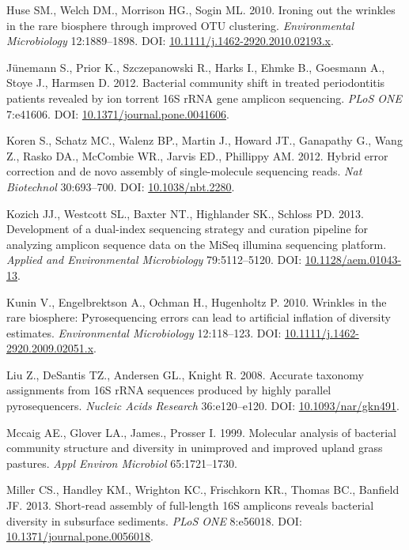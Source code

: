 \documentclass[11pt,]{article}
\begin{document}
\hypertarget{ref-Huse2010}{}
Huse SM., Welch DM., Morrison HG., Sogin ML. 2010. Ironing out the
wrinkles in the rare biosphere through improved OTU clustering.
\emph{Environmental Microbiology} 12:1889--1898. DOI:
\href{https://doi.org/10.1111/j.1462-2920.2010.02193.x}{10.1111/j.1462-2920.2010.02193.x}.

\hypertarget{ref-Junemann2012}{}
Jünemann S., Prior K., Szczepanowski R., Harks I., Ehmke B., Goesmann
A., Stoye J., Harmsen D. 2012. Bacterial community shift in treated
periodontitis patients revealed by ion torrent 16S rRNA gene amplicon
sequencing. \emph{PLoS ONE} 7:e41606. DOI:
\href{https://doi.org/10.1371/journal.pone.0041606}{10.1371/journal.pone.0041606}.

\hypertarget{ref-Koren2012}{}
Koren S., Schatz MC., Walenz BP., Martin J., Howard JT., Ganapathy G.,
Wang Z., Rasko DA., McCombie WR., Jarvis ED., Phillippy AM. 2012. Hybrid
error correction and de novo assembly of single-molecule sequencing
reads. \emph{Nat Biotechnol} 30:693--700. DOI:
\href{https://doi.org/10.1038/nbt.2280}{10.1038/nbt.2280}.

\hypertarget{ref-Kozich2013}{}
Kozich JJ., Westcott SL., Baxter NT., Highlander SK., Schloss PD. 2013.
Development of a dual-index sequencing strategy and curation pipeline
for analyzing amplicon sequence data on the MiSeq illumina sequencing
platform. \emph{Applied and Environmental Microbiology} 79:5112--5120.
DOI: \href{https://doi.org/10.1128/aem.01043-13}{10.1128/aem.01043-13}.

\hypertarget{ref-Kunin2010}{}
Kunin V., Engelbrektson A., Ochman H., Hugenholtz P. 2010. Wrinkles in
the rare biosphere: Pyrosequencing errors can lead to artificial
inflation of diversity estimates. \emph{Environmental Microbiology}
12:118--123. DOI:
\href{https://doi.org/10.1111/j.1462-2920.2009.02051.x}{10.1111/j.1462-2920.2009.02051.x}.

\hypertarget{ref-Liu2008}{}
Liu Z., DeSantis TZ., Andersen GL., Knight R. 2008. Accurate taxonomy
assignments from 16S rRNA sequences produced by highly parallel
pyrosequencers. \emph{Nucleic Acids Research} 36:e120--e120. DOI:
\href{https://doi.org/10.1093/nar/gkn491}{10.1093/nar/gkn491}.

\hypertarget{ref-Mccaig1999}{}
Mccaig AE., Glover LA., James., Prosser I. 1999. Molecular analysis of
bacterial community structure and diversity in unimproved and improved
upland grass pastures. \emph{Appl Environ Microbiol} 65:1721--1730.

\hypertarget{ref-Miller2013}{}
Miller CS., Handley KM., Wrighton KC., Frischkorn KR., Thomas BC.,
Banfield JF. 2013. Short-read assembly of full-length 16S amplicons
reveals bacterial diversity in subsurface sediments. \emph{PLoS ONE}
8:e56018. DOI:
\href{https://doi.org/10.1371/journal.pone.0056018}{10.1371/journal.pone.0056018}.
\end{document}
